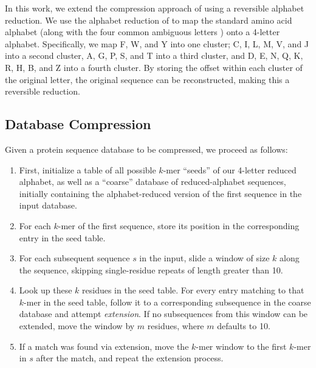 \documentclass{amsbook}
\theoremstyle{definition}
\theoremstyle{remark}
\numberwithin{equation}{section}
\begin{document}
In this work, we extend the compression approach of \citet{Daniels:2013} using
a reversible alphabet reduction.
We use the alphabet reduction of \citet{Murphy:2000} to map the standard amino
acid alphabet (along with the four common ambiguous letters ) onto a 4-letter 
alphabet.
Specifically, we map F, W, and Y into one cluster; C, I, L, M, V, and J into
a second cluster, A, G, P, S, and T into a third cluster, and
D, E, N, Q, K, R, H, B, and Z into a fourth cluster.
By storing the offset within each cluster of the original letter, the original
sequence can be reconstructed, making this a reversible reduction.

\subsection*{Database Compression}

Given a protein sequence database to be compressed, we proceed as follows:
\begin{enumerate}
        \item First, initialize a table of all possible $k$-mer ``seeds'' of
        our 4-letter reduced alphabet, as well as a ``coarse'' database of
        reduced-alphabet sequences, initially containing the alphabet-reduced
        version of the first sequence in the input database.
        \item For each $k$-mer of the first sequence, store its position in the
        corresponding entry in the seed table.
        \item For each subsequent sequence $s$ in the input, slide a window of 
        size $k$ along the sequence, skipping single-residue repeats of length
        greater than 10.
        \item Look up these $k$ residues in the seed table.
        For every entry matching to that $k$-mer in the seed table, follow
        it to a corresponding subsequence in the coarse database and attempt
        \textit{extension}.
        If no subsequences from this window can be extended, move the window
        by $m$ residues, where $m$ defaults to 10.
        \item If a match was found via extension, move the $k$-mer window to
        the first $k$-mer in $s$ after the match, and repeat the extension
        process.
\end{enumerate}
        
\end{document}
